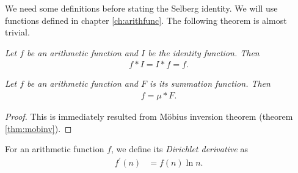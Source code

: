 \documentclass{subfile}
\begin{document}
	We need some definitions before stating the Selberg identity. We will use functions defined in chapter \eqref{ch:arithfunc}. The following theorem is almost trivial.
	\begin{theorem}\slshape
		Let $f$ be an arithmetic function and $I$ be the identity function. Then
			\begin{align*}
				f\ast I=I\ast f=f.
			\end{align*}
	\end{theorem}

	\begin{theorem}\slshape
		\label{thm:dirichmobi}
		Let $f$ be an arithmetic function and $F$ is its summation function. Then
			\begin{align*}
				f=\mu\ast F.
			\end{align*}
	\end{theorem}
	
	\begin{proof}
		This is immediately resulted from M\" obius inversion theorem (theorem \eqref{thm:mobinv}).
	\end{proof}
	
	\begin{definition}
		For an arithmetic function $f$, we define its \textit{Dirichlet derivative} as
			\begin{align*}
				f^\prime(n) & =f(n)\ln n.
			\end{align*}
	\end{definition}
	
\end{document}
